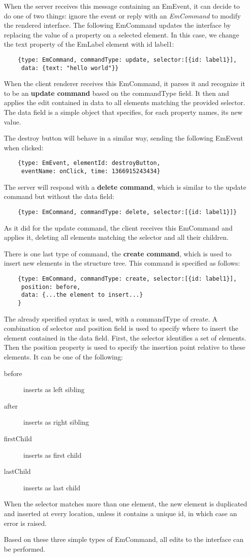 When the server receives this message containing an EmEvent, it can decide to do one of two things: ignore the event or reply with an \textit{EmCommand} to modify the rendered interface. The following EmCommand updates the interface by replacing the value of a property on a selected element. In this case, we change the text property of the EmLabel element with id label1:

\begin{verbatim}
    {type: EmCommand, commandType: update, selector:[{id: label1}],
     data: {text: "hello world"}}
\end{verbatim}

When the client renderer receives this EmCommand, it parses it and recognize it to be an \textbf{update command} based on the commandType field. It then and applies the edit contained in data to all elements matching the provided selector. The data field is a simple object that specifies, for each property names, its new value.

The destroy button will behave in a similar way, sending the following EmEvent when clicked:

\begin{verbatim}
    {type: EmEvent, elementId: destroyButton,
     eventName: onClick, time: 1366915243434}
\end{verbatim}

The server will respond with a \textbf{delete command}, which is similar to the update command but without the data field:

\begin{verbatim}
    {type: EmCommand, commandType: delete, selector:[{id: label1}]}
\end{verbatim}

As it did for the update command, the client receives this EmCommand and applies it, deleting all elements matching the selector and all their children.

There is one last type of command, the \textbf{create command}, which is used to insert new elements in the structure tree. This command is specified as follows:

\begin{verbatim}
    {type: EmCommand, commandType: create, selector:[{id: label1}],
     position: before,
     data: {...the element to insert...}
    }
\end{verbatim}

The already specified syntax is used, with a commandType of create. A combination of selector and position field is used to specify where to insert the element contained in the data field. First, the selector identifies a set of elements. Then the position property is used to specify the insertion point relative to these elements. It can be one of the following:
\begin{description}
     \item[before] inserts as left sibling
     \item[after] inserts as right sibling
     \item[firstChild] inserts as first child
     \item[lastChild] inserts as last child
 \end{description}

When the selector matches more than one element, the new element is duplicated and inserted at every location, unless it contains a unique id, in which case an error is raised.

Based on these three simple types of EmCommand, all edits to the interface can be performed.
